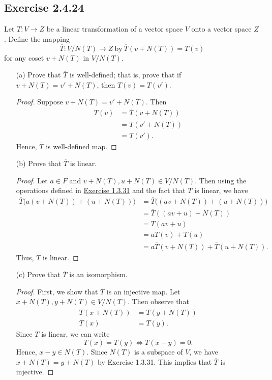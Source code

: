\subsection*{Exercise 2.4.24} Let \( T: V \to Z  \) be a linear transformation of a vector space \( V  \) onto a vector space \( Z  \). Define the mapping
\[  \overline{T}: V / N(T) \to Z \ \text{by} \ \overline{T}(v + N(T)) = T(v)  \] 
for any coset \( v + N(T)  \) in \( V / N(T) \).
\begin{enumerate}
    \item[(a)] Prove that \( \overline{T} \) is well-defined; that is, prove that if \( v + N(T) = v' + N(T)  \), then \( T(v) = T(v')  \).
        \begin{proof}
        Suppose \( v + N(T) = v' + N(T) \). Then 
        \begin{align*}
            T(v) &= \overline{T}(v + N(T)) \\
                 &= \overline{T}(v' + N(T)) \\
                 &= T(v').
        \end{align*}
        Hence, \( \overline{T}  \) is well-defined map.
        \end{proof}
    \item[(b)] Prove that \( \overline{T}  \) is linear.
        \begin{proof}
        Let \( a \in F  \) and \( v + N(T), u + N(T) \in V / N(T) \). Then using the operations defined in {\hyperref[Exercise 1.3.31]{Exercise 1.3.31}} and the fact that \( T  \) is linear, we have 
        \begin{align*}
            \overline{T}\Big(a(v + N(T)) + (u + N(T))\Big) &= \overline{T} \Big(  (av + N(T)) + (u + N(T)) \Big) \\
                                                           &= \overline{T}( (av + u) + N(T)) \\
                                                           &= T(av + u) \\
                                                           &= aT(v) + T(u) \\
                                                           &= a \overline{T}(v + N(T)) + \overline{T}(u + N(T)).
        \end{align*}
    Thus, \( \overline{T} \) is linear.
        \end{proof}
    \item[(c)] Prove that \( \overline{T}  \) is an isomorphism.
        \begin{proof}
            First, we show that \( \overline{T} \) is an injective map. Let \( x + N(T), y + N(T) \in V / N(T) \). Then observe that
            \begin{align*}
                \overline{T}(x + N(T)) &= \overline{T}(y + N(T)) \\
                T(x) &= T(y). 
            \end{align*}
            Since \( T  \) is linear, we can write
            \[  T(x) = T(y) \iff T(x-y) = 0. \]
            Hence, \( x - y \in N(T) \). Since \( N(T)  \) is a subspace of \( V  \), we have \( x + N(T) = y + N(T)  \) by Exercise 1.3.31. This implies that \( \overline{T}  \) is injective. 


\end{proof}
\end{enumerate}
